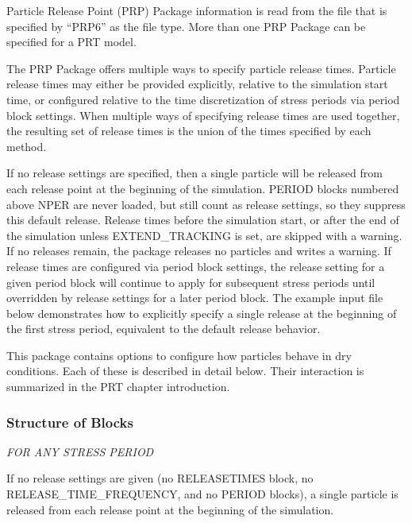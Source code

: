 Particle Release Point (PRP) Package information is read from the file that is specified by ``PRP6'' as the file type.  More than one PRP Package can be specified for a PRT model. 

The PRP Package offers multiple ways to specify particle release times.  Particle release times may either be provided explicitly, relative to the simulation start time, or configured relative to the time discretization of stress periods via period block settings.  When multiple ways of specifying release times are used together, the resulting set of release times is the union of the times specified by each method.

If no release settings are specified, then a single particle will be released from each release point at the beginning of the simulation.  PERIOD blocks numbered above NPER are never loaded, but still count as release settings, so they suppress this default release.  Release times before the simulation start, or after the end of the simulation unless EXTEND\_TRACKING is set, are skipped with a warning.  If no releases remain, the package releases no particles and writes a warning.  If release times are configured via period block settings, the release setting for a given period block will continue to apply for subsequent stress periods until overridden by release settings for a later period block.  The example input file below demonstrates how to explicitly specify a single release at the beginning of the first stress period, equivalent to the default release behavior.

This package contains options to configure how particles behave in dry conditions. Each of these is described in detail below. Their interaction is summarized in the PRT chapter introduction.

\vspace{5mm}
\subsubsection{Structure of Blocks}




\vspace{5mm}
\noindent \textit{FOR ANY STRESS PERIOD}

\packageperioddescription \: If no release settings are given (no RELEASETIMES block, no RELEASE\_TIME\_FREQUENCY, and no PERIOD blocks), a single particle is released from each release point at the beginning of the simulation.


